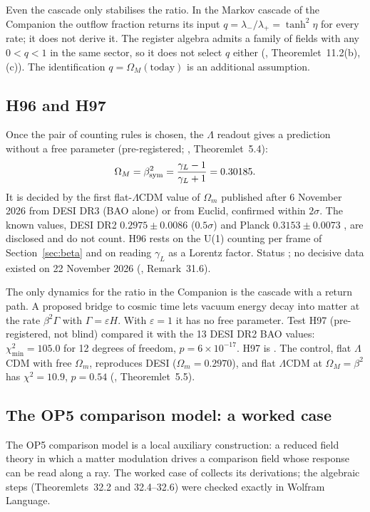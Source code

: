 Even the cascade only stabilises the ratio.  In the Markov cascade of the Companion the outflow fraction returns its input
$q=\lambda_-/\lambda_+=\tanh^2\eta$ for every rate; it does not derive it.  The register algebra admits a family of fields with any $0<q<1$ in the same
sector, so it does not select $q$ either (, Theoremlet~11.2(b),(c)).  The identification $q=\Omega_M(\text{today})$ is an additional assumption.

\subsection{H96 and H97}
\label{sec:lop5-h96}

Once the pair of counting rules is chosen, the $\Lambda$ readout gives a prediction without a free parameter (pre-registered; , Theoremlet~5.4):
\begin{equation}
 \Omega_M=\beta_{\mathrm{sym}}^2=\frac{\gamma_L-1}{\gamma_L+1}=0.30185 .
 \label{eq:lop5-h96}
\end{equation}
It is decided by the first flat-$\Lambda$CDM value of $\Omega_m$ published after 6 November 2026 from DESI DR3 (BAO alone) or from Euclid,
confirmed within $2\sigma$.  The known values, DESI DR2 $0.2975\pm0.0086$ \cite{DESIDR2} ($0.5\sigma$) and Planck $0.3153\pm0.0073$
\cite{Planck2018}, are disclosed and do not count.  H96 rests on the U(1) counting per frame of Section~\ref{sec:beta} and on reading $\gamma_L$ as a
Lorentz factor.  Status \Open; no decisive data existed on 22 November 2026 (, Remark~31.6).

The only dynamics for the ratio in the Companion is the cascade with a return path.  A proposed bridge to cosmic time lets vacuum energy decay
into matter at the rate $\beta^2\Gamma$ with $\Gamma=\varepsilon H$.  With $\varepsilon=1$ it has no free parameter.  Test H97 (pre-registered,
not blind) compared it with the 13 DESI DR2 BAO values: $\chi^2_{\min}=105.0$ for 12 degrees of freedom, $p=6\times10^{-17}$.  H97 is
\Refuted.  The control, flat $\Lambda$CDM with free $\Omega_m$, reproduces DESI ($\Omega_m=0.2970$), and flat $\Lambda$CDM at $\Omega_M=\beta^2$ has
$\chi^2=10.9$, $p=0.54$ (, Theoremlet~5.5).

\subsection{The OP5 comparison model: a worked case}
\label{sec:lop5-worked}

The OP5 comparison model is a local auxiliary construction: a reduced field theory in which a matter modulation drives a comparison field whose
response can be read along a ray.  The worked case of  collects its derivations; the algebraic steps (Theoremlets~32.2 and 32.4--32.6) were checked exactly in Wolfram Language.

